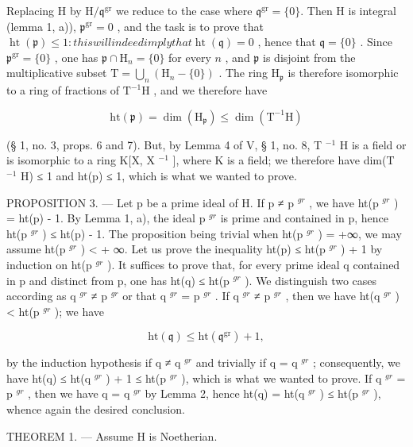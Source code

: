 Replacing H by \(\mathrm{H} / \mathfrak{q}^{\mathrm{gr}}\) we reduce to the case where \(\mathfrak{q}^{\mathrm{gr}} = \{0\}\). Then H is integral (lemma 1, a)), \(\mathfrak{p}^{\mathrm{gr}} = 0\) , and the task is to prove that \(\operatorname{ht}(\mathfrak{p}) \leqslant 1: this will indeed imply that  \operatorname{ht}(\mathfrak{q}) = 0\) , hence that \(\mathfrak{q} = \{0\}\) . Since \(\mathfrak{p}^{\mathrm{gr}} = \{0\}\) , one has \(\mathfrak{p} \cap \mathrm{H}_n = \{0\}\) for every \(n\) , and \(\mathfrak{p}\) is disjoint from the multiplicative subset \(\mathrm{T} = \bigcup_{n} (\mathrm{H}_n - \{0\})\) . The ring \(\mathrm{H}_{\mathfrak{p}}\) is therefore isomorphic to a ring of fractions of \(\mathrm{T}^{-1}\mathrm{H}\) , and we therefore have

\[
\mathrm{ht} (\mathfrak {p}) = \dim (\mathrm{H} _ {\mathfrak {p}}) \leqslant \dim (\mathrm{T} ^ {- 1} \mathrm{H})
\]

(§ 1, no. 3, props. 6 and 7). But, by Lemma 4 of V, § 1, no. 8, T \(^{-1}\) H is a field or is isomorphic to a ring K{[}X, X \(^{-1}\) {]}, where K is a field; we therefore have dim(T \(^{-1}\) H) ≤ 1 and ht(p) ≤ 1, which is what we wanted to prove.

PROPOSITION 3. --- Let p be a prime ideal of H. If p ≠ p \(^{gr}\) , we have ht(p \(^{gr}\) ) = ht(p) - 1. By Lemma 1, a), the ideal p \(^{gr}\) is prime and contained in p, hence ht(p \(^{gr}\) ) ≤ ht(p) - 1. The proposition being trivial when ht(p \(^{gr}\) ) = +∞, we may assume ht(p \(^{gr}\) ) \textless{} + ∞. Let us prove the inequality ht(p) ≤ ht(p \(^{gr}\) ) + 1 by induction on ht(p \(^{gr}\) ). It suffices to prove that, for every prime ideal q contained in p and distinct from p, one has ht(q) ≤ ht(p \(^{gr}\) ). We distinguish two cases according as q \(^{gr}\) ≠ p \(^{gr}\) or that q \(^{gr}\) = p \(^{gr}\) . If q \(^{gr}\) ≠ p \(^{gr}\) , then we have ht(q \(^{gr}\) ) \textless{} ht(p \(^{gr}\) ); we have

\[
\mathrm{ht} (\mathfrak {q}) \leqslant \mathrm{ht} (\mathfrak {q} ^ {\mathrm{gr}}) + 1,
\]

by the induction hypothesis if q ≠ q \(^{gr}\) and trivially if q = q \(^{gr}\) ; consequently, we have ht(q) ≤ ht(q \(^{gr}\) ) + 1 ≤ ht(p \(^{gr}\) ), which is what we wanted to prove. If q \(^{gr}\) = p \(^{gr}\) , then we have q = q \(^{gr}\) by Lemma 2, hence ht(q) = ht(q \(^{gr}\) ) ≤ ht(p \(^{gr}\) ), whence again the desired conclusion.

THEOREM 1. --- Assume H is Noetherian.

